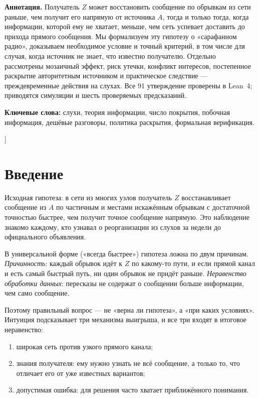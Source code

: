 \documentclass[10pt,a4paper,twocolumn]{article}
\theoremstyle{plain}
\begin{document}
{\begin{center}
\begin{minipage}{0.86\textwidth}
\medskip
\noindent\textbf{Аннотация.}
Получатель $Z$ может восстановить сообщение по обрывкам из сети раньше, чем получит его напрямую от источника $A$, тогда и только тогда, когда информации, которой ему не хватает, меньше, чем сеть успевает доставить до прихода прямого сообщения. Мы формализуем эту гипотезу о «сарафанном радио», доказываем необходимое условие и точный критерий, в том числе для случая, когда источник не знает, что известно получателю. Отдельно рассмотрены мозаичный эффект, риск утечки, конфликт интересов, постепенное раскрытие авторитетным источником и практическое следствие — преждевременные действия на слухах. Все 91 утверждение проверены в Lean~4; приводятся симуляции и шесть проверяемых предсказаний.

\smallskip
\noindent\textbf{Ключевые слова:} слухи, теория информации, число покрытия, побочная информация, дешёвые разговоры, политика раскрытия, формальная верификация.
\end{minipage}
\end{center}
\vspace{12pt}
}]

\section{Введение}

Исходная гипотеза: в сети из многих узлов получатель $Z$ восстанавливает сообщение из $A$ по частичным и местами искажённым обрывкам с достаточной точностью быстрее, чем получит точное сообщение напрямую. Это наблюдение знакомо каждому, кто узнавал о реорганизации из слухов за недели до официального объявления.

В универсальной форме («всегда быстрее») гипотеза ложна по двум причинам.
\emph{Причинность}: каждый обрывок идёт к $Z$ по какому-то пути, и если прямой канал и есть самый быстрый путь, ни один обрывок не придёт раньше.
\emph{Неравенство обработки данных}: пересказы не содержат о сообщении больше информации, чем само сообщение.

Поэтому правильный вопрос — не «верна ли гипотеза», а «при каких условиях». Интуиция подсказывает три механизма выигрыша, и все три входят в итоговое неравенство:
\begin{enumerate}
\item широкая сеть против узкого прямого канала;
\item знания получателя: ему нужно узнать не всё сообщение, а только то, что отличает его от уже известных вариантов;
\item допустимая ошибка: для решения часто хватает приближённого понимания.
\end{enumerate}
\end{document}
